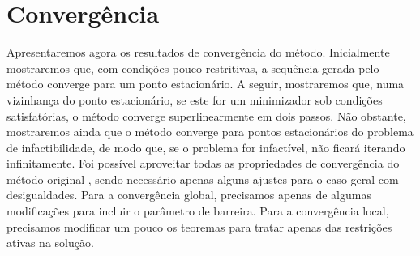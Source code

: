 \chapter{Convergência}\label{chap:teoria}

Apresentaremos agora os resultados de convergência do método. Inicialmente
mostraremos que, com condições pouco restritivas, a sequência gerada pelo método
converge para um ponto estacionário. A seguir, mostraremos que, numa vizinhança
do ponto estacionário, se este for um minimizador sob condições satisfatórias, o
método converge superlinearmente em dois passos. Não obstante, mostraremos ainda
que o método converge para pontos estacionários do problema de infactibilidade, de
modo que, se o problema for infactível, não ficará iterando infinitamente.
Foi possível aproveitar todas as propriedades de convergência do método
original \cite{bib:chico-dci}, sendo necessário apenas alguns ajustes para o caso geral com
desigualdades. Para a convergência global, precisamos apenas de algumas
modificações para incluir o parâmetro de barreira. Para a convergência local,
precisamos modificar um pouco os teoremas para tratar apenas das restrições
ativas na solução. 




